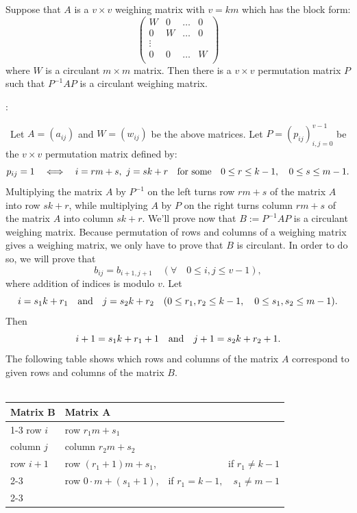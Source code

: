 {{{\begin{thm} \label{tm1}
 Suppose that $A$ is a $v \times v$ weighing matrix with $v=km$ 
     which has the block form: 
	  \[ \left( \begin{array}{cccc}
	W   & 0 & \ldots & 0 \\
	0 & W & \ldots & 0 \\
	\vdots  \\
	0 & 0 & \ldots & W \\
	       \end{array}      \right)   \]
	  where $W$ is a circulant $m \times m$ matrix. 
	  Then there is a $v \times v$ permutation matrix $P$ such that 
	  $P^{-1}AP$ is a circulant weighing matrix.
\end{thm}     
\begin{pr}:
{\rm
	\ Let $A=(a_{ij})$ and $W=(w_{ij})$ be the above matrices. 
	Let $P=(p_{ij})_{i,j=0}^{v-1}$ be the $v \times v$ permutation 
	matrix defined by: 
$$ p_{ij}=1 \quad \Longleftrightarrow \quad i=rm+s, \ j=sk+r  \quad 
	{\rm for \ some} \quad 0 \leq r \leq k-1, \quad 0 \leq s \leq m-1.$$
	Multiplying the matrix $A$ by $P^{-1}$ on the left turns row  
	$ rm+s $ of the matrix $A$ into row $sk+r$, while 
	multiplying $A$ by $P$ on the right turns 
	column  $ rm+s $ of the matrix $A$ into column $sk+r$.    
	We'll prove now that $B:=P^{-1}AP$ is a circulant weighing matrix.  
	Because permutation of rows and columns of a weighing matrix gives a weighing 
	matrix, we only have to prove that $B$ is circulant. 
	In order to do so, we will prove that  
		$$ b_{ij}=b_{i+1,j+1} \quad (\forall \quad  0 \leq i,j \leq v-1),$$ 
	where addition of indices is modulo $v$.
	Let 
		$$ i=s_1k+r_1 \quad {\rm and } \quad j=s_2k+r_2 \quad
		 (0 \leq r_{1},r_{2} \leq k-1, \quad 0 \leq s_{1},s_{2} \leq m-1).$$
	Then 
		$$ i+1=s_1k+r_1+1 \quad {\rm and } \quad j+1=s_2k+r_2+1 .$$
  The following table shows which rows and columns of the matrix $A$ 
  correspond to given rows and columns of the matrix $B$.\\
  { \ }\\
\begin{tabular}{||l|lr||}      \hline
  Matrix B     &  Matrix A & \\ \cline{1-3}
  row $i$      &  row  $r_1m+s_1$   & \\ \hline
  column $j$   & column  $r_2m+s_2$ & \\ \hline
  row $i+1$    & row  $(r_1+1)m+s_1$,        &  if $r_1 \neq k-1$    \\ \cline{2-3}
	       & row  $0 \cdot m+(s_1+1)$,   &  if $r_1=k-1, \quad s_1 \neq m-1$         \\ \cline{2-3}

\end{tabular}}
\end{pr}}}}
